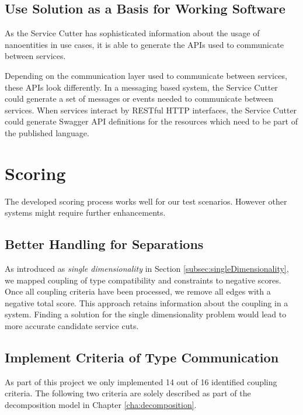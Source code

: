 
\subsection{Use Solution as a Basis for Working Software}

As the Service Cutter has sophisticated information about the usage of nanoentities in use cases, it is able to generate the APIs used to communicate between services. 

Depending on the communication layer used to communicate between services, these \gls{API}s look differently. In a messaging based system, the Service Cutter could generate a set of messages or events needed to communicate between services. When services interact by RESTful HTTP interfaces, the Service Cutter could generate Swagger\cite{swagger} \gls{API} definitions for the resources which need to be part of the published language. 

\section{Scoring}

The developed scoring process works well for our test scenarios. However other systems might require further enhancements.

\subsection{Better Handling for Separations}
\label{sec:handling-for-separations}

As introduced as \textit{single dimensionality} in Section \ref{subsec:singleDimensionality}, we mapped coupling of type compatibility and constraints to negative scores. Once all coupling criteria have been processed, we remove all edges with a negative total score. This approach retains information about the coupling in a system. Finding a solution for the single dimensionality problem would lead to more accurate candidate service cuts.

\subsection{Implement Criteria of Type Communication}

As part of this project we only implemented 14 out of 16 identified coupling criteria. The following two criteria are solely described as part of the decomposition model in Chapter \ref{cha:decomposition}.


